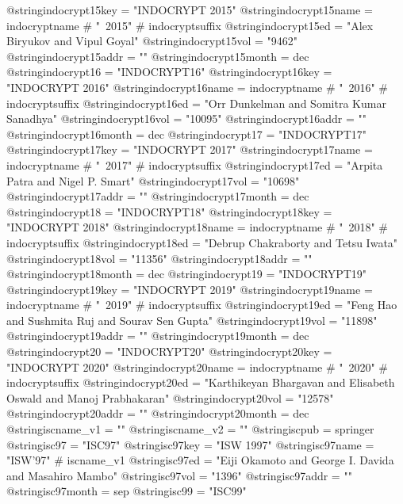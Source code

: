 @string{indocrypt15key =        "INDOCRYPT 2015"}
@string{indocrypt15name =       indocryptname # "~2015" # indocryptsuffix}
@string{indocrypt15ed =         "Alex Biryukov and Vipul Goyal"}
@string{indocrypt15vol =        "9462"}
@string{indocrypt15addr =       ""}
@string{indocrypt15month =      dec}
@string{indocrypt16 =           "INDOCRYPT16"}
@string{indocrypt16key =        "INDOCRYPT 2016"}
@string{indocrypt16name =       indocryptname # "~2016" # indocryptsuffix}
@string{indocrypt16ed =         "Orr Dunkelman and Somitra Kumar Sanadhya"}
@string{indocrypt16vol =        "10095"}
@string{indocrypt16addr =       ""}
@string{indocrypt16month =      dec}
@string{indocrypt17 =           "INDOCRYPT17"}
@string{indocrypt17key =        "INDOCRYPT 2017"}
@string{indocrypt17name =       indocryptname # "~2017" # indocryptsuffix}
@string{indocrypt17ed =         "Arpita Patra and Nigel P. Smart"}
@string{indocrypt17vol =        "10698"}
@string{indocrypt17addr =       ""}
@string{indocrypt17month =      dec}
@string{indocrypt18 =           "INDOCRYPT18"}
@string{indocrypt18key =        "INDOCRYPT 2018"}
@string{indocrypt18name =       indocryptname # "~2018" # indocryptsuffix}
@string{indocrypt18ed =         "Debrup Chakraborty and Tetsu Iwata"}
@string{indocrypt18vol =        "11356"}
@string{indocrypt18addr =       ""}
@string{indocrypt18month =      dec}
@string{indocrypt19 =           "INDOCRYPT19"}
@string{indocrypt19key =        "INDOCRYPT 2019"}
@string{indocrypt19name =       indocryptname # "~2019" # indocryptsuffix}
@string{indocrypt19ed =         "Feng Hao and Sushmita Ruj and Sourav {Sen Gupta}"}
@string{indocrypt19vol =        "11898"}
@string{indocrypt19addr =       ""}
@string{indocrypt19month =      dec}
@string{indocrypt20 =           "INDOCRYPT20"}
@string{indocrypt20key =        "INDOCRYPT 2020"}
@string{indocrypt20name =       indocryptname # "~2020" # indocryptsuffix}
@string{indocrypt20ed =         "Karthikeyan Bhargavan and Elisabeth Oswald and Manoj Prabhakaran"}
@string{indocrypt20vol =        "12578"}
@string{indocrypt20addr =       ""}
@string{indocrypt20month =      dec}
@string{iscname_v1 =            ""}
@string{iscname_v2 =            ""}
@string{iscpub =                springer}
@string{isc97 =                 "ISC97"}
@string{isc97key =              "ISW 1997"}
@string{isc97name =             "ISW'97" # iscname_v1}
@string{isc97ed =               "Eiji Okamoto and George I. Davida and Masahiro Mambo"}
@string{isc97vol =              "1396"}
@string{isc97addr =             ""}
@string{isc97month =            sep}
@string{isc99 =                 "ISC99"}
